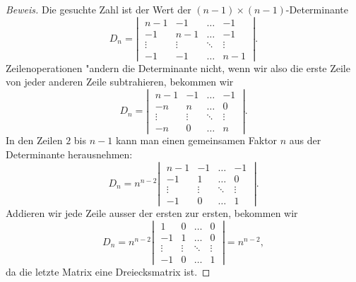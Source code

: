 \begin{proof}[Beweis]
Die gesuchte Zahl ist der Wert der $(n-1)\times(n-1)$-Determinante
\[
D_n
=
\left|\;
\begin{matrix}
n-1   &  -1  & \dots & -1 \\
 -1   & n-1  & \dots & -1 \\
\vdots&\vdots&\ddots &\vdots\\
 -1   &  -1  &\dots  &n-1
\end{matrix}
\;\right|.
\]
Zeilenoperationen "andern die Determinante nicht, wenn wir also die
erste Zeile von jeder anderen Zeile subtrahieren, bekommen wir
\[
D_n=
\left|\;
\begin{matrix}
n-1   &  -1  & \dots & -1 \\
 -n   & n    & \dots &  0 \\
\vdots&\vdots&\ddots &\vdots\\
 -n   &   0  &\dots  &n  
\end{matrix}
\;\right|.
\]
In den Zeilen $2$ bis $n-1$ kann man einen gemeinsamen Faktor $n$
aus der Determinante herausnehmen:
\[
D_n=
n^{n-2}
\left|\;
\begin{matrix}
n-1   &  -1  & \dots & -1 \\
 -1   & 1    & \dots &  0 \\
\vdots&\vdots&\ddots &\vdots\\
 -1   &   0  &\dots  &1  
\end{matrix}
\;\right|.
\]
Addieren wir jede Zeile ausser der ersten zur ersten, bekommen wir
\[
D_n=
n^{n-2}
\left|\;
\begin{matrix}
  1   &   0  & \dots &  0 \\
 -1   & 1    & \dots &  0 \\
\vdots&\vdots&\ddots &\vdots\\
 -1   &   0  &\dots  &1  
\end{matrix}
\;\right|=n^{n-2},
\]
da die letzte Matrix eine Dreiecksmatrix ist.
\end{proof}
